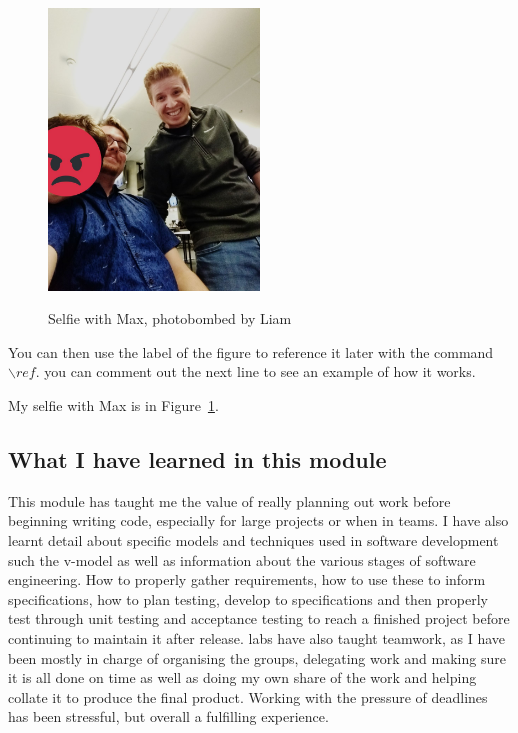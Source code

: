 \begin{figure}[h]
\caption{Selfie with Max, photobombed by Liam}
\centering
\includegraphics[width=0.5\textwidth]{MaxSelfie1.jpg}
\label{fig:selfie}
\end{figure}

You can then use the label of the figure to reference it later with the command ${\backslash}ref$. you can comment out the next line to see an example of how it works.

My selfie with Max is in  Figure~\ref{fig:selfie}.

\subsection{What I have learned in this module}
This module has taught me the value of really planning out work before beginning writing code, especially for large projects or when in teams. I have also learnt detail about specific models and techniques used in software development such the v-model as well as information about the various stages of software engineering. How to properly gather requirements, how to use these to inform specifications, how to plan testing, develop to specifications and then properly test through unit testing and acceptance testing to reach a finished project before continuing to maintain it after release. labs have also taught teamwork, as I have been mostly in charge of organising the groups, delegating work and making sure it is all done on time as well as doing my own share of the work and helping collate it to produce the final product. Working with the pressure of deadlines has been stressful, but overall a fulfilling experience.
